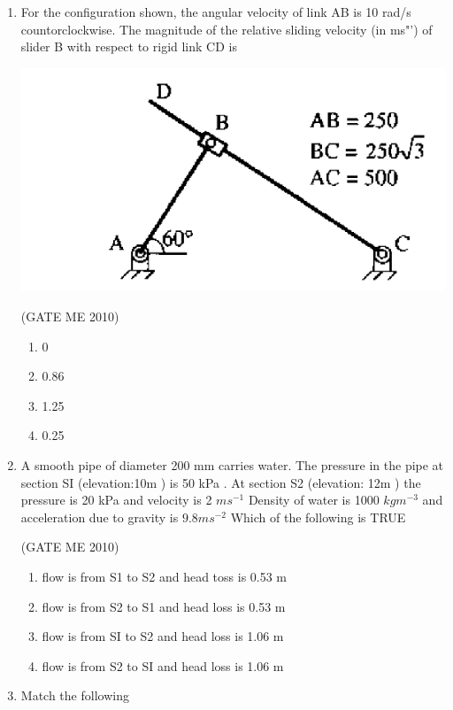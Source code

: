 \documentclass[journal,12pt,onecolumn]{IEEEtran}
\theoremstyle{remark}
\begin{document}
\begin{enumerate}
\item For the configuration shown, the angular velocity of link AB is 10 rad/s countorclockwise. The magnitude of the relative sliding velocity (in ms"') of slider B with respect to rigid link CD is
\begin{center}
    \includegraphics[width=0.7\linewidth]{figs/fig4.png}
\end{center}


\hfill{(GATE  ME 2010)}\\


\begin{multicols}{4}
\begin{enumerate}
\item 0
\item 0.86
\item 1.25
\item 0.25
\end{enumerate}
\end{multicols}


\item A smooth pipe of diameter 200 mm carries water. The pressure in the pipe at section SI (elevation:10m ) is 50 kPa . At section S2 (elevation: 12m ) the pressure is 20 kPa and velocity is 2 $ms^{-1}$
Density of water is 1000  $kgm^{-3}$ and acceleration due to gravity is $9.8 ms^{-2}$  Which of the  following is TRUE


\hfill{(GATE  ME 2010)}\\

\begin{enumerate}
\item  flow is from S1 to S2 and head toss is 0.53 m
\item  flow is from S2 to S1 and head loss is 0.53 m
\item  flow is from SI to S2 and head loss is 1.06 m
\item  flow is from S2 to SI and head loss is 1.06 m
\end{enumerate}


\item  Match the following 


\end{enumerate}
\end{document}
